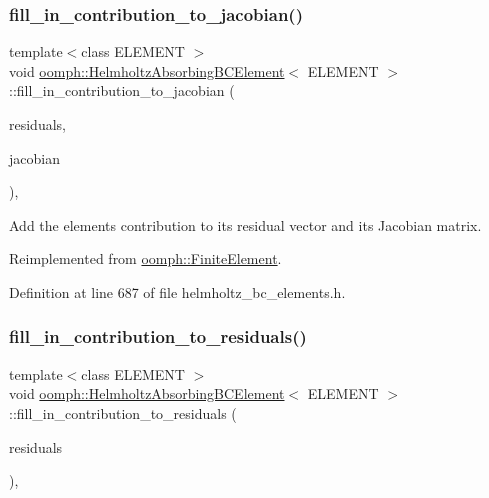 \subsubsection{\texorpdfstring{fill\+\_\+in\+\_\+contribution\+\_\+to\+\_\+jacobian()}{fill\_in\_contribution\_to\_jacobian()}}
{\footnotesize\ttfamily template$<$class E\+L\+E\+M\+E\+NT $>$ \\
void \hyperlink{classoomph_1_1HelmholtzAbsorbingBCElement}{oomph\+::\+Helmholtz\+Absorbing\+B\+C\+Element}$<$ E\+L\+E\+M\+E\+NT $>$\+::fill\+\_\+in\+\_\+contribution\+\_\+to\+\_\+jacobian (\begin{DoxyParamCaption}\item[{\hyperlink{classoomph_1_1Vector}{Vector}$<$ double $>$ \&}]{residuals,  }\item[{\hyperlink{classoomph_1_1DenseMatrix}{Dense\+Matrix}$<$ double $>$ \&}]{jacobian }\end{DoxyParamCaption})\hspace{0.3cm}{\ttfamily [inline]}, {\ttfamily [virtual]}}



Add the element\textquotesingle{}s contribution to its residual vector and its Jacobian matrix. 



Reimplemented from \hyperlink{classoomph_1_1FiniteElement_a0ae7af222af38a0d53bf283dc85bdfea}{oomph\+::\+Finite\+Element}.



Definition at line 687 of file helmholtz\+\_\+bc\+\_\+elements.\+h.

\mbox{\label{classoomph_1_1HelmholtzAbsorbingBCElement_a4835fe36ebcb4d9a9e6845fb5a75224b}} 
\subsubsection{\texorpdfstring{fill\+\_\+in\+\_\+contribution\+\_\+to\+\_\+residuals()}{fill\_in\_contribution\_to\_residuals()}}
{\footnotesize\ttfamily template$<$class E\+L\+E\+M\+E\+NT $>$ \\
void \hyperlink{classoomph_1_1HelmholtzAbsorbingBCElement}{oomph\+::\+Helmholtz\+Absorbing\+B\+C\+Element}$<$ E\+L\+E\+M\+E\+NT $>$\+::fill\+\_\+in\+\_\+contribution\+\_\+to\+\_\+residuals (\begin{DoxyParamCaption}\item[{\hyperlink{classoomph_1_1Vector}{Vector}$<$ double $>$ \&}]{residuals }\end{DoxyParamCaption})\hspace{0.3cm}{\ttfamily [inline]}, {\ttfamily [virtual]}}



